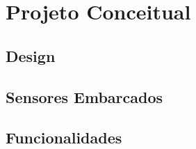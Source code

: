 \section{Projeto Conceitual}
\label{sec:projeto-conceitual}

\subsection{Design}
\label{subsec:design}

\subsection{Sensores Embarcados}
\label{subsec:sensores-embarcados}

\subsection{Funcionalidades}
\label{subsec:funcionalidades}
